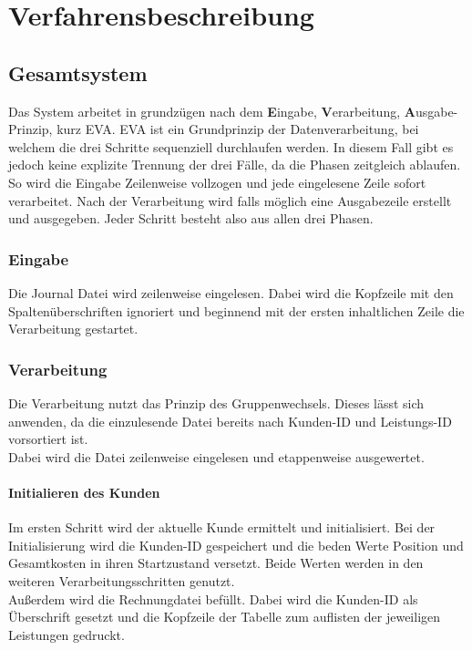 \chapter{Verfahrensbeschreibung}\label{ch:verfahrensbeschreibung}


\section{Gesamtsystem}\label{sec:gesamtsystem}
Das System arbeitet in grundzügen nach dem \textbf{E}ingabe, \textbf{V}erarbeitung, \textbf{A}usgabe-Prinzip, kurz EVA.
EVA ist ein Grundprinzip der Datenverarbeitung, bei welchem die drei Schritte sequenziell durchlaufen werden.
In diesem Fall gibt es jedoch keine explizite Trennung der drei Fälle, da die Phasen zeitgleich ablaufen. So wird die Eingabe Zeilenweise vollzogen und jede eingelesene Zeile sofort verarbeitet. Nach der Verarbeitung wird falls möglich eine Ausgabezeile erstellt und ausgegeben. Jeder Schritt besteht also aus allen drei Phasen.\\

\subsection{Eingabe}\label{subsec:eingabe}
Die Journal Datei wird zeilenweise eingelesen. Dabei wird die Kopfzeile mit den Spaltenüberschriften ignoriert und beginnend mit der ersten inhaltlichen Zeile die Verarbeitung gestartet.\\

\subsection{Verarbeitung}\label{subsec:verarbeitung}
Die Verarbeitung nutzt das Prinzip des Gruppenwechsels. Dieses lässt sich anwenden, da die einzulesende Datei bereits nach Kunden-ID und Leistungs-ID vorsortiert ist.\\
Dabei wird die Datei zeilenweise eingelesen und etappenweise ausgewertet.

\subsubsection{Initialieren des Kunden}\label{subsubsec:initialisieren-des-kunden}
Im ersten Schritt wird der aktuelle Kunde ermittelt und initialisiert. Bei der Initialisierung wird die Kunden-ID gespeichert und die beden Werte Position und Gesamtkosten in ihren Startzustand versetzt. Beide Werten werden in den weiteren Verarbeitungsschritten genutzt.\\
Außerdem wird die Rechnungdatei befüllt. Dabei wird die Kunden-ID als Überschrift gesetzt und die Kopfzeile der Tabelle zum auflisten der jeweiligen Leistungen gedruckt.\\


